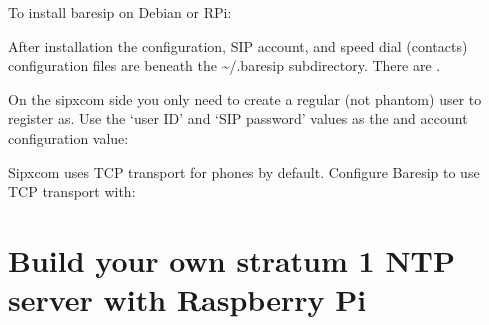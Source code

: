 \documentclass[letterpaper,10pt,english]{sphinxmanual}
\begin{document}
To install baresip on Debian or RPi:

\begin{sphinxVerbatim}[commandchars=\\\{\}]
\end{sphinxVerbatim}

After installation the configuration, SIP account, and speed dial (contacts) configuration files are beneath the \textasciitilde{}/.baresip subdirectory.
There are .

On the sipxcom side you only need to create a regular (not phantom) user to register as.
Use the ‘user ID’ and ‘SIP password’ values as the  and  account configuration value:

\begin{sphinxVerbatim}[commandchars=\\\{\}]
\end{sphinxVerbatim}

Sipxcom uses TCP transport for phones by default. Configure Baresip to use TCP transport with:

\begin{sphinxVerbatim}[commandchars=\\\{\}]
\end{sphinxVerbatim}


\section{Build your own stratum 1 NTP server with Raspberry Pi}
\label{\detokenize{howto:build-your-own-stratum-1-ntp-server-with-raspberry-pi}}
\end{document}

